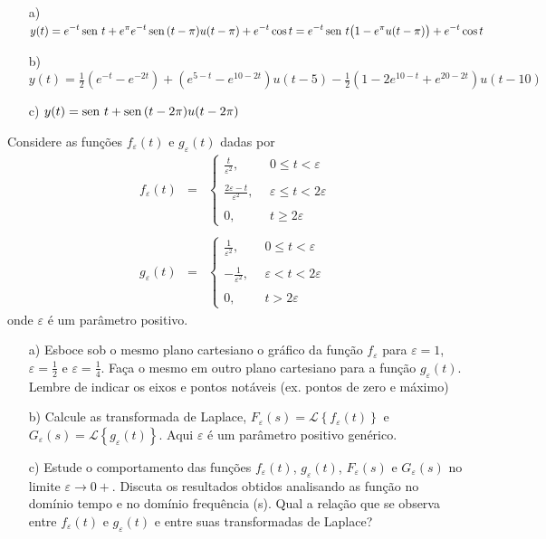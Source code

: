 \begin{resp}
\begin{itemize}
  \item[a)] $\displaystyle y(t) = e^{-t} \operatorname{sen}\, t + e^\pi e^{-t} \operatorname{sen}\, (t-\pi) u (t-\pi)  + e^{-t} \cos t  = e^{-t} \operatorname{sen}\, t \big( 1 - e^\pi u (t-\pi) \big)  + e^{-t} \cos t$
  \item[b)] $\displaystyle y(t) = \frac{1}{2} ( e^{-t} - e^{-2t} ) +  ( e^{5-t} - e^{10-2t} )u(t-5) - \frac{1}{2} (1 - 2e^{10-t} + e^{20-2t} )u(t-10)$
  \item[c)] $\displaystyle y(t) = \operatorname{sen}\, t + \operatorname{sen}\,(t-2\pi) u(t-2\pi)$
\end{itemize}
\end{resp}
\begin{exer}{\label{ex_delta_dirac0}} Considere as funções $f_\varepsilon (t)$  e $g_\varepsilon (t)$ dadas por
\begin{eqnarray*}
 f_\varepsilon(t)&=&\left\{\begin{array}{ll}
			    \frac{t}{\varepsilon^2}, ~~ &0\leq t < \varepsilon\\~\\
			    \frac{2\varepsilon-t}{\varepsilon^2}, ~~ &\varepsilon\leq t < 2\varepsilon\\~\\
			    0,&t\geq 2\varepsilon
			    \end{array}
\right.\\~\\
g_\varepsilon(t)&=&\left\{\begin{array}{ll}
			    \frac{1}{\varepsilon^2}, ~~ &0\leq t < \varepsilon\\~\\
			    -\frac{1}{\varepsilon^2}, ~~ &\varepsilon< t < 2\varepsilon\\~\\
			    0,&t>2\varepsilon
			    \end{array}
\right.
\end{eqnarray*}
onde $\varepsilon$ é um parâmetro positivo.
\begin{itemize}
  \item [a)] Esboce sob o mesmo plano cartesiano o gráfico da função $f_\varepsilon$ para $\varepsilon=1$, $\varepsilon=\frac{1}{2}$ e $\varepsilon=\frac{1}{4}$. Faça o mesmo em outro plano cartesiano para a função $g_\varepsilon(t)$. Lembre de indicar os eixos e pontos notáveis (ex. pontos de zero e máximo)
  \item [b)] Calcule as transformada de Laplace, $F_\varepsilon(s)=\mathcal{L}\left\{f_\varepsilon(t)\right\}$ e $G_\varepsilon(s)=\mathcal{L}\left\{g_\varepsilon(t)\right\}$. Aqui $\varepsilon$ é um parâmetro positivo genérico.
\item [c)] Estude o comportamento das funções $f_\varepsilon(t)$, $g_\varepsilon(t)$, $F_\varepsilon(s)$ e $G_\varepsilon(s)$ no limite $\varepsilon\to 0+$. Discuta os resultados obtidos analisando as função no domínio tempo e no domínio frequência (s). Qual a relação que se observa entre $f_\varepsilon(t)$ e $g_\varepsilon(t)$ e entre suas transformadas de Laplace?
\end{itemize}
\end{exer}


